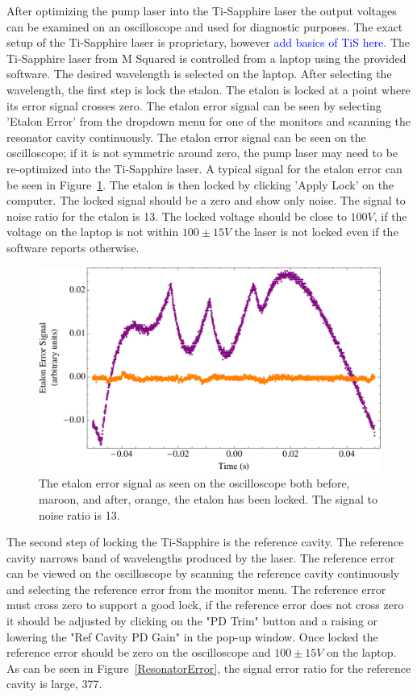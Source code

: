 \documentclass[prb,preprint]{revtex4-1}
\begin{document}
After optimizing the pump laser into the Ti-Sapphire laser the output voltages can be examined on an oscilloscope and used for diagnostic purposes. The exact setup of the Ti-Sapphire laser is proprietary, however \textcolor{blue}{add basics of TiS here.} The Ti-Sapphire laser from M Squared is controlled from a laptop using the provided software. The desired wavelength is selected on the laptop. After selecting the wavelength, the first step is lock the etalon. The etalon is locked at a point where its error signal crosses zero. The etalon error signal can be seen by selecting 'Etalon Error' from the dropdown menu for one of the monitors and scanning the resonator cavity continuously. The etalon error signal can be seen on the oscilloscope; if it is not symmetric around zero, the pump laser may need to be re-optimized into the Ti-Sapphire laser. A typical signal for the etalon error can be seen in Figure~\ref{EtalonError}. The etalon is then locked by clicking 'Apply Lock' on the computer. The locked signal should be a zero and show only noise. The signal to noise ratio for the etalon is 13. The locked voltage should be close to $100 V$, if the voltage on the laptop is not within $100 \pm 15 V$ the laser is not locked even if the software reports otherwise.

\begin{figure}[h!]
\centering
\includegraphics[width=6in]{EtalonError.pdf}
\caption{The etalon error signal as seen on the oscilloscope both before, maroon, and after, orange, the etalon has been locked. The signal to noise ratio is 13.}
\label{EtalonError}
\end{figure}

The second step of locking the Ti-Sapphire is the reference cavity. The reference cavity narrows  band of wavelengths produced by the laser. The reference error can be viewed on the oscilloscope by scanning the reference cavity continuously and selecting the reference error from the monitor menu. The reference error must cross zero to support a good lock, if the reference error does not cross zero it should be adjusted by clicking on the "PD Trim" button and a raising or lowering the "Ref Cavity PD Gain" in the pop-up window. Once locked the reference error should be zero on the oscilloscope and $100 \pm 15 V$ on the laptop. As can be seen in Figure~\ref{ResonatorError}, the signal error ratio for the reference cavity is large, 377.
\end{document}
